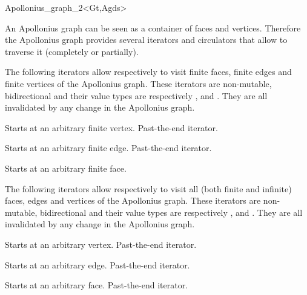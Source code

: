\begin{ccRefClass}{Apollonius_graph_2<Gt,Agds>}


An Apollonius graph can be seen as a container of faces and vertices.
Therefore the Apollonius graph provides several iterators and circulators
that allow to traverse it (completely or partially).





The following iterators allow respectively to visit 
finite faces,  finite edges and  finite vertices
of the Apollonius graph. These iterators are non-mutable,
bidirectional and their value types are respectively
,  and . 
They are all invalidated by any change in the Apollonius graph.

{Starts at an arbitrary finite vertex.}
\ccGlue
{}
{Past-the-end iterator.}

{Starts at an arbitrary finite edge.}
\ccGlue
{}
{Past-the-end iterator.}

{Starts at an arbitrary finite face.}
\ccGlue
{}

The following iterators allow respectively to visit all
(both finite and infinite) faces, edges and vertices
of the Apollonius graph. These iterators are non-mutable, bidirectional
and their value types are respectively
,  and . 
They are all invalidated by any change in the Apollonius graph.


{Starts at an arbitrary  vertex.}
\ccGlue
{}
{Past-the-end iterator.}

{Starts at an arbitrary edge.}
\ccGlue
{}
{Past-the-end iterator.}

{Starts at an arbitrary face.}
\ccGlue
{}
{Past-the-end iterator.}




\end{ccRefClass}
